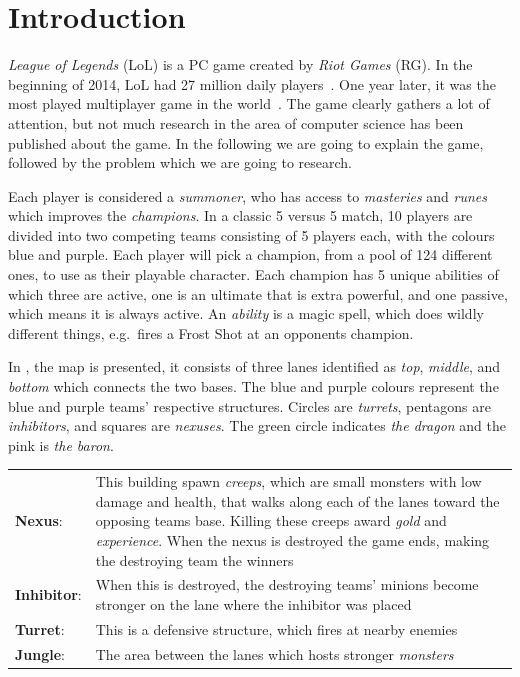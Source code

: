 \section{Introduction}\label{sec:intro}


\emph{League of Legends} (LoL) is a PC game created by \emph{Riot Games} (RG). In the beginning of 2014, LoL had 27 million daily players~\cite{LoL27mill}. One year later, it was the most played multiplayer game in the world~\cite{LoLmostplayed}. The game clearly gathers a lot of attention, but not much research in the area of computer science has been published about the game. In the following we are going to explain the game, followed by the problem which we are going to research. 

Each player is considered a \emph{summoner}, who has access to \emph{masteries} and \emph{runes} which improves the \emph{champions}. In a classic 5 versus 5 match, 10 players are divided into two competing teams consisting of 5 players each, with the colours blue and purple. Each player will pick a champion, from a pool of 124 different ones, to use as their playable character. Each champion has 5 unique abilities of which three are active, one is an ultimate that is extra powerful, and one passive, which means it is always active. An \emph{ability} is a magic spell, which does wildly different things, e.g.\ fires a Frost Shot at an opponents champion. 

In , the map is presented, it consists of three lanes identified as \emph{top}, \emph{middle}, and \emph{bottom} which connects the two bases. The blue and purple colours represent the blue and purple teams' respective structures. Circles are \emph{turrets}, pentagons are \emph{inhibitors}, and squares are \emph{nexuses}. The green circle indicates \emph{the dragon} and the pink is \emph{the baron}.

\begin{table}[!h]
  \begin{tabular}{l p{13cm}}
    \textbf{Nexus}: & This building spawn \emph{creeps}, which are small monsters with low damage and health, that walks along each of the lanes toward the opposing teams base. Killing these creeps award \emph{gold} and \emph{experience}. When the nexus is destroyed the game ends, making the destroying team the winners\\
    \textbf{Inhibitor}: & When this is destroyed, the destroying teams' minions become stronger on the lane where the inhibitor was placed\\
    \textbf{Turret}: & This is a defensive structure, which fires at nearby enemies\\
    \textbf{Jungle}: & The area between the lanes which hosts stronger \emph{monsters}\\
  \end{tabular}
\end{table}

